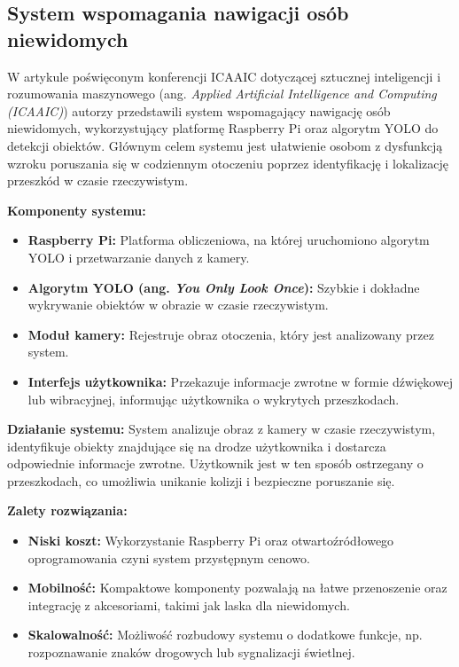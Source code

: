 \documentclass[a4paper,twoside,12pt]{book}
\begin{document}
\subsection{System wspomagania nawigacji osób niewidomych}

W artykule \cite{bib:parvadhavardhni2023blind} poświęconym konferencji ICAAIC dotyczącej sztucznej inteligencji i rozumowania maszynowego (ang. \textit{Applied Artificial Intelligence and Computing (ICAAIC)}) autorzy przedstawili system wspomagający nawigację osób niewidomych, wykorzystujący platformę Raspberry Pi oraz algorytm YOLO do detekcji obiektów. Głównym celem systemu jest ułatwienie osobom z dysfunkcją wzroku poruszania się w codziennym otoczeniu poprzez identyfikację i lokalizację przeszkód w czasie rzeczywistym.

\textbf{Komponenty systemu:}
\begin{itemize}
    \item \textbf{Raspberry Pi:} Platforma obliczeniowa, na której uruchomiono algorytm YOLO i przetwarzanie danych z kamery.
    \item \textbf{Algorytm YOLO (ang. \textit{You Only Look Once}):} Szybkie i dokładne wykrywanie obiektów w obrazie w czasie rzeczywistym.
    \item \textbf{Moduł kamery:} Rejestruje obraz otoczenia, który jest analizowany przez system.
    \item \textbf{Interfejs użytkownika:} Przekazuje informacje zwrotne w formie dźwiękowej lub wibracyjnej, informując użytkownika o wykrytych przeszkodach.
\end{itemize}

\textbf{Działanie systemu:}
System analizuje obraz z kamery w czasie rzeczywistym, identyfikuje obiekty znajdujące się na drodze użytkownika i dostarcza odpowiednie informacje zwrotne. Użytkownik jest w ten sposób ostrzegany o przeszkodach, co umożliwia unikanie kolizji i bezpieczne poruszanie się.

\textbf{Zalety rozwiązania:}
\begin{itemize}
    \item \textbf{Niski koszt:} Wykorzystanie Raspberry Pi oraz otwartoźródłowego oprogramowania czyni system przystępnym cenowo.
    \item \textbf{Mobilność:} Kompaktowe komponenty pozwalają na łatwe przenoszenie oraz integrację z akcesoriami, takimi jak laska dla niewidomych.
    \item \textbf{Skalowalność:} Możliwość rozbudowy systemu o dodatkowe funkcje, np. rozpoznawanie znaków drogowych lub sygnalizacji świetlnej.
\end{itemize}
\end{document}
